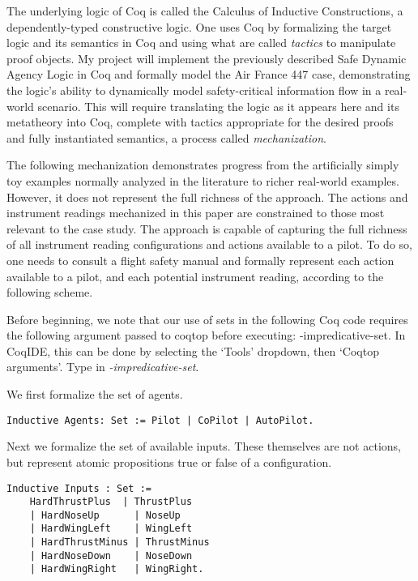 The underlying logic of Coq is called the Calculus of Inductive Constructions, a dependently-typed constructive logic. One uses Coq by formalizing the target logic and its semantics in Coq and using what are called \emph{tactics} to manipulate proof objects. My project will implement the previously described Safe Dynamic Agency Logic in Coq and formally model the Air France 447 case, demonstrating the logic's ability to dynamically model safety-critical information flow in a real-world scenario. This will require translating the logic as it appears here and its metatheory into Coq, complete with tactics appropriate for the desired proofs and fully instantiated semantics, a process called \emph{mechanization}.

The following mechanization demonstrates progress from the artificially simply toy examples normally analyzed in the literature to richer real-world examples. However, it does not represent the full richness of the approach. The actions and instrument readings mechanized in this paper are constrained to those most relevant to the case study. The approach is capable of capturing the full richness of all instrument reading configurations and actions available to a pilot. To do so, one needs to consult a flight safety manual and formally represent each action available to a pilot, and each potential instrument reading, according to the following scheme.

Before beginning, we note that our use of sets in the following Coq code requires the following argument passed to coqtop before executing: -impredicative-set. In CoqIDE, this can be done by selecting the `Tools' dropdown, then `Coqtop arguments'. Type in \emph{-impredicative-set}.

We first formalize the set of agents.
\begin{tcolorbox}
	\begin{lstlisting}[language=Coq]
	Inductive Agents: Set := Pilot | CoPilot | AutoPilot.
	\end{lstlisting}
\end{tcolorbox}

Next we formalize the set of available inputs. These themselves are not actions, but represent atomic propositions true or false of a configuration.


\begin{tcolorbox}
	\begin{lstlisting}[language=Coq]
	Inductive Inputs : Set := 
	HardThrustPlus  | ThrustPlus 
	| HardNoseUp      | NoseUp 
	| HardWingLeft    | WingLeft
	| HardThrustMinus | ThrustMinus
	| HardNoseDown    | NoseDown 
	| HardWingRight   | WingRight.
	\end{lstlisting}
\end{tcolorbox}

